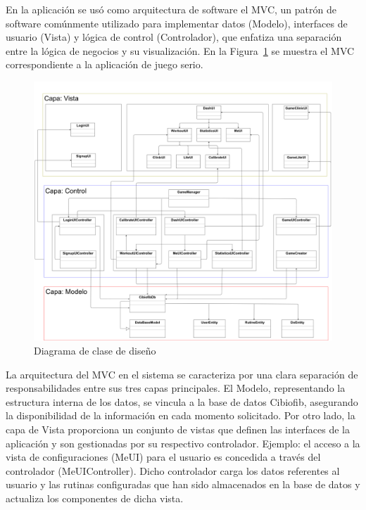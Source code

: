 En la aplicación se usó como arquitectura de software el MVC, un patrón de software comúnmente utilizado para implementar datos (Modelo), interfaces de usuario (Vista) y lógica de control (Controlador), que enfatiza una separación entre la lógica de negocios y su visualización. En la Figura~\ref{fig: software-architecture} se muestra el MVC correspondiente a la aplicación de juego serio.

\begin{figure}[ht]
    \centering
    \includegraphics[scale=0.18]{images/software-architecture.png}
    \caption{Diagrama de clase de diseño}
    \label{fig: software-architecture}
\end{figure}

La arquitectura del MVC en el sistema se caracteriza por una clara separación de responsabilidades entre sus tres capas principales. El Modelo, representando la estructura interna de los datos, se vincula a la base de datos Cibiofib, asegurando la disponibilidad de la información en cada momento solicitado. Por otro lado, la capa de Vista proporciona un conjunto de vistas que definen las interfaces de la aplicación y son gestionadas por su respectivo controlador. Ejemplo: el acceso a la vista de configuraciones (MeUI) para el usuario es concedida a través del controlador (MeUIController). Dicho controlador carga los datos referentes al usuario y las rutinas configuradas que han sido almacenados en la base de datos y actualiza los componentes de dicha vista.






